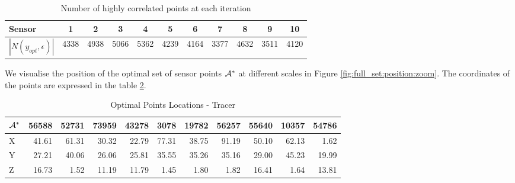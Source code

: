 \begin{table}[h]
    \centering
    \begin{tabular}{l|cccccccccc}
    \toprule
    Sensor & 1 & 2 & 3 & 4 & 5 & 6 & 7 & 8 & 9 & 10 \\     \midrule
        $|N(y_{opt},\epsilon)|$ & 4338 & 4938 & 5066 & 5362 & 4239 & 4164 & 3377 & 4632 & 3511 & 4120 \\     \bottomrule

    \end{tabular}
    \caption{Number of highly correlated points at each iteration}
    \label{tab:full:d_opt}
\end{table}


We visualise the position of the optimal set of sensor points $\mathcal{A}^*$ at different scales in Figure \ref{fig:full_set:position:zoom}. The coordinates of the points are expressed in the table \ref{tab:full:data}. \\


\begin{table}[h]
\centering
\footnotesize
\begin{tabular}{l|rrrrrrrrrr}
\toprule
$\mathcal{A}^*$ &  56588 &  52731 &  73959 &  43278 &  3078  &  19782 &  56257 &  55640 &  10357 &  54786 \\ \midrule
X &  41.61 &  61.31 &  30.32 &  22.79 &  77.31 &  38.75 &  91.19 &  50.10 &  62.13 &   1.62 \\
Y &  27.21 &  40.06 &  26.06 &  25.81 &  35.55 &  35.26 &  35.16 &  29.00 &  45.23 &  19.99 \\
Z &  16.73 &   1.52 &  11.19 &  11.79 &   1.45 &   1.80 &   1.82 &  16.41 &   1.64 &  13.81 \\
\bottomrule
\end{tabular}
\caption{Optimal Points Locations - Tracer}
\label{tab:full:data}
\end{table}



